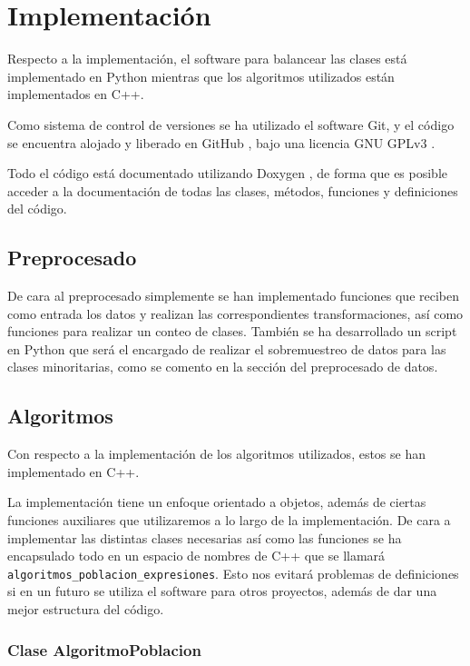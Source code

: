 \section{Implementación}

Respecto a la implementación, el software para balancear las clases está implementado en Python mientras que los algoritmos utilizados están implementados en C++.

Como sistema de control de versiones se ha utilizado el software Git, y el código se encuentra alojado y liberado en GitHub \cite{githubProyecto}, bajo una licencia GNU GPLv3 \cite{gplv3}.

Todo el código está documentado utilizando Doxygen \cite{doxygen}, de forma que es posible acceder a la documentación de todas las clases, métodos, funciones y definiciones del código.

\subsection{Preprocesado}

De cara al preprocesado simplemente se han implementado funciones que reciben como entrada los datos y realizan las correspondientes transformaciones, así como funciones para realizar un conteo de clases. También se ha desarrollado un script en Python que será el encargado de realizar el sobremuestreo de datos para las clases minoritarias, como se comento en la sección del preprocesado de datos.

\subsection{Algoritmos}

Con respecto a la implementación de los algoritmos utilizados, estos se han implementado en C++.

La implementación tiene un enfoque orientado a objetos, además de ciertas funciones auxiliares que utilizaremos a lo largo de la implementación. De cara a implementar las distintas clases necesarias así como las funciones se ha encapsulado todo en un espacio de nombres de C++ que se llamará \texttt{algoritmos\_poblacion\_expresiones}. Esto nos evitará problemas de definiciones si en un futuro se utiliza el software para otros proyectos, además de dar una mejor estructura del código.

\subsubsection{Clase AlgoritmoPoblacion}

